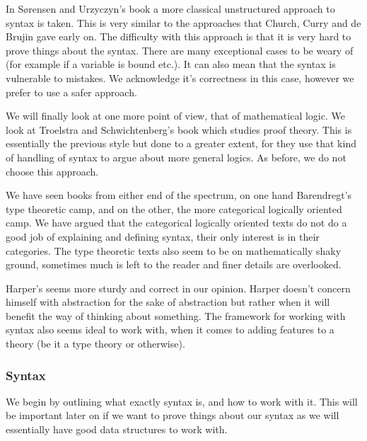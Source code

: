 In S{\o}rensen and Urzyczyn's book \cite{Sorensen:2006:LCI:1197021} a more classical unstructured approach to syntax is taken. This is very similar to the approaches that Church, Curry and de Brujin gave early on. The difficulty with this approach is that it is very hard to prove things about the syntax. There are many exceptional cases to be weary of (for example if a variable is bound etc.). It can also mean that the syntax is vulnerable to mistakes. We acknowledge it's correctness in this case, however we prefer to use a safer approach.

We will finally look at one more point of view, that of mathematical logic. We look at Troelstra and Schwichtenberg's book \cite{troelstra_schwichtenberg_2000} which studies proof theory. This is essentially the previous style but done to a greater extent, for they use that kind of handling of syntax to argue about more general logics. As before, we do not choose this approach.

We have seen books from either end of the spectrum, on one hand Barendregt's type theoretic camp, and on the other, the more categorical logically oriented camp. We have argued that the categorical logically oriented texts do not do a good job of explaining and defining syntax, their only interest is in their categories. The type theoretic texts also seem to be on mathematically shaky ground, sometimes much is left to the reader and finer details are overlooked.

Harper's seems more sturdy and correct in our opinion. Harper doesn't concern himself with abstraction for the sake of abstraction but rather when it will benefit the way of thinking about something. The framework for working with syntax also seems ideal to work with, when it comes to adding features to a theory (be it a type theory or otherwise).

\subsubsection{Syntax}

We begin by outlining what exactly syntax is, and how to work with it. This will be important later on if we want to prove things about our syntax as we will essentially have good data structures to work with.



